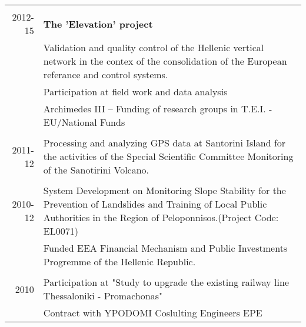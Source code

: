 \documentclass[a4paper]{Classes/cv_prof_en} %
\begin{document}
\begin{longtable}{r|p{15cm}}
\multicolumn{2}{c}{} \\
\textsc{}2012-15 & \bf{The 'Elevation' project} \\
				& Validation and quality control of the Hellenic vertical network in the contex of the consolidation of the European referance and control systems.\\
			& Participation at field work and data analysis\\
			& Archimedes III – Funding of research groups in T.E.I. - EU/National Funds\\
\multicolumn{2}{c}{}\\
\textsc{}2011-12 & Processing and analyzing GPS data at Santorini Island for the activities of the Special Scientific Committee Monitoring of the Sanotirini Volcano.\\
\multicolumn{2}{c}{}\\
\textsc{}2010-12 & System Development on Monitoring Slope Stability for the Prevention of Landslides and Training of Local Public Authorities in the Region of Peloponnisos.(Project Code: EL0071) \\
			& Funded EEA Financial Mechanism and Public Investments Progremme of the Hellenic Republic.\\
\multicolumn{2}{c}{}\\
\textsc{} 2010 & Participation at "Study to upgrade the existing railway line Thessaloniki - Promachonas"\\
		& Contract with YPODOMI Coslulting Engineers EPE\\


\end{longtable}

\end{document}
